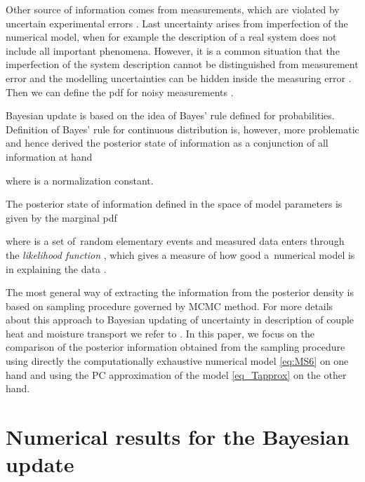 \documentclass[preprint,12pt]{elsarticle}
\begin{document}
Other source of information comes from measurements, which are
violated by uncertain experimental errors
. Last uncertainty 
arises from imperfection of the numerical model, when for example
the description of a real system does not include all important
phenomena.  However, it is a common situation that the
imperfection of the system description cannot be distinguished
from measurement error  and the modelling uncertainties
 can be hidden inside the measuring error
. Then we can define the pdf
 for noisy measurements
.

Bayesian update is based on the idea of Bayes' rule defined for
probabilities. Definition of Bayes' rule for continuous distribution
is, however, more problematic and hence \cite[Chapter
1.5]{Tarantola:2005} derived the posterior state of information
 as a conjunction of all information at hand

where  is a normalization constant.

The posterior state of information defined in the space of model
parameters  is given by the marginal pdf

where  is a set of~random elementary events
 and measured data  enters through the {\it
  likelihood function} , which gives a measure of how good
a~numerical model is in explaining the data .

The most general way of extracting the information from the
posterior density  is based on
sampling procedure governed by MCMC method. For more details about
this approach to Bayesian updating of uncertainty in description
of couple heat and moisture transport we refer to
\cite{Kucerova:2011:AMC}. In this paper, we focus on the
comparison of the posterior information obtained from the sampling
procedure using directly the computationally exhaustive numerical
model \eqref{eq:MS6} on one hand and using the PC approximation of
the model \eqref{eq_Tapprox} on the other hand.


\section{Numerical results for the Bayesian update}
\label{sec:bayes_res}
\end{document}
